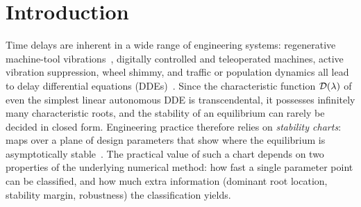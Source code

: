\section{Introduction}\label{sec:intro}

Time delays are inherent in a wide range of engineering systems: regenerative
machine-tool vibrations~\cite{tobias1958theory,tlusty1963stability,altintas1995analytical,munoa2016chatter},
digitally controlled and teleoperated machines, active vibration suppression,
wheel shimmy, and traffic or population dynamics all lead to delay differential
equations (DDEs)~\cite{bellman1963differential,stepan1989retarded,hale1993introduction,michiels2014stability}.
Since the characteristic function $\mathcal{D}(\lambda)$ of even the simplest linear
autonomous DDE is transcendental, it possesses infinitely many characteristic
roots, and the stability of an equilibrium can rarely be decided in closed
form. Engineering practice therefore relies on \emph{stability charts}:
maps over a plane of design parameters that show where the equilibrium is
asymptotically stable~\cite{insperger2011semidiscretization,sipahi2011stability}.
The practical value of such a chart depends on two properties of the
underlying numerical method: how fast a single parameter point can be
classified, and how much extra information (dominant root location,
stability margin, robustness) the classification yields.

